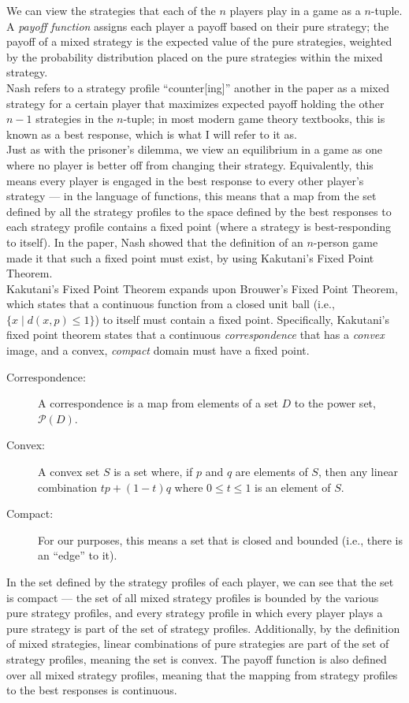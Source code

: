 \documentclass[12pt]{extarticle}
\begin{document}
  We can view the strategies that each of the $n$ players play in a game as a $n$-tuple. A \textit{payoff function} assigns each player a payoff based on their pure strategy; the payoff of a mixed strategy is the expected value of the pure strategies, weighted by the probability distribution placed on the pure strategies within the mixed strategy.\\

  Nash refers to a strategy profile ``counter[ing]'' another in the paper as a mixed strategy for a certain player that maximizes expected payoff holding the other $n-1$ strategies in the $n$-tuple; in most modern game theory textbooks, this is known as a best response, which is what I will refer to it as.\\

  Just as with the prisoner's dilemma, we view an equilibrium in a game as one where no player is better off from changing their strategy. Equivalently, this means every player is engaged in the best response to every other player's strategy --- in the language of functions, this means that a map from the set defined by all the strategy profiles to the space defined by the best responses to each strategy profile contains a fixed point (where a strategy is best-responding to itself). In the paper, Nash showed that the definition of an $n$-person game made it that such a fixed point must exist, by using Kakutani's Fixed Point Theorem.\\

  Kakutani's Fixed Point Theorem expands upon Brouwer's Fixed Point Theorem, which states that a continuous function from a closed unit ball (i.e., $\{x\mid d(x,p) \leq 1\}$) to itself must contain a fixed point. Specifically, Kakutani's fixed point theorem states that a continuous \textit{correspondence} that has a \textit{convex} image, and a convex, \textit{compact} domain must have a fixed point.
  \begin{description}
    \item[Correspondence:] A correspondence is a map from elements of a set $D$ to the power set, $\mathcal{P}(D)$.
    \item[Convex:] A convex set $S$ is a set where, if $p$ and $q$ are elements of $S$, then any linear combination $tp + (1-t)q$ where $0\leq t \leq 1$ is an element of $S$.
    \item[Compact:] For our purposes, this means a set that is closed and bounded (i.e., there is an ``edge'' to it).
  \end{description}
  In the set defined by the strategy profiles of each player, we can see that the set is compact --- the set of all mixed strategy profiles is bounded by the various pure strategy profiles, and every strategy profile in which every player plays a pure strategy is part of the set of strategy profiles. Additionally, by the definition of mixed strategies, linear combinations of pure strategies are part of the set of strategy profiles, meaning the set is convex. The payoff function is also defined over all mixed strategy profiles, meaning that the mapping from strategy profiles to the best responses is continuous.\\
\end{document}
